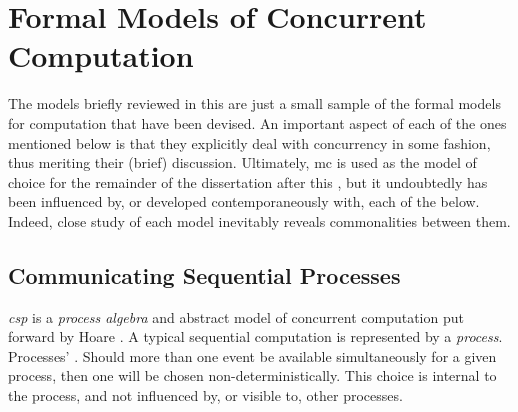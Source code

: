 \section{\label{sec:back:formalmodels}Formal Models of Concurrent Computation}


The models briefly reviewed in this  are just a small sample of the formal models for computation that have been devised.  An important aspect of each of the ones mentioned below is that they explicitly deal with concurrency in some fashion, thus meriting their (brief) discussion.  Ultimately, \gls{mc} is used as the model of choice for the remainder of the dissertation after this , but it undoubtedly has been influenced by, or developed contemporaneously with, each of the below.  Indeed, close study of each model inevitably reveals commonalities between them.

\subsection{\label{subsec:back:csp}Communicating Sequential Processes}

\emph{\Gls{csp}} is a \emph{process algebra} and abstract model of concurrent computation put forward by Hoare \cite{Hoare1985,Roscoe2011}.  A typical sequential computation is represented by a \emph{process}.  Processes' .  Should more than one event be available simultaneously for a given process, then one will be chosen non-deterministically.  This choice is internal to the process, and not influenced by, or visible to, other processes.

